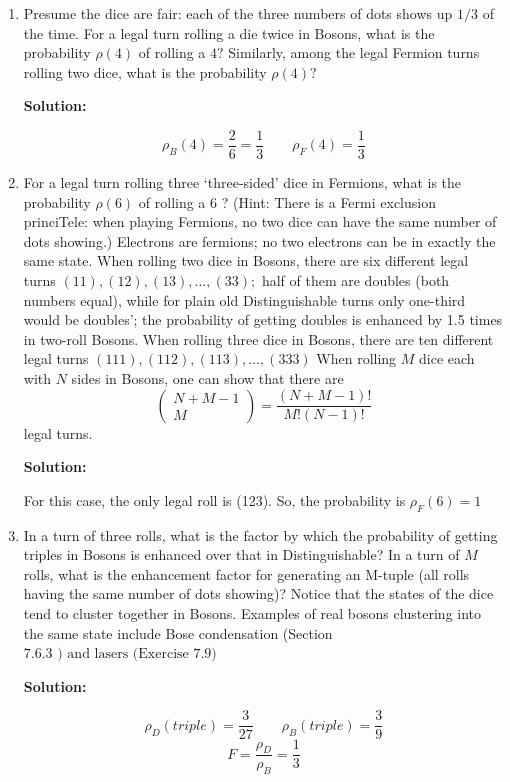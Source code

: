 \documentclass[10pt]{article}
\newenvironment{Solution}
    {\textbf{Solution:}
    
    \vspace{5mm}
    \begin{tcolorbox}
    }
    {
    \end{tcolorbox}
    \vspace{5mm}
    }
\begin{document}
\begin{enumerate}
    \item Presume the dice are fair: each of the three numbers of dots shows up $1 / 3$ of the time. For a legal turn rolling a die twice in Bosons, what is the probability $\rho(4)$ of rolling a $4 ?$ Similarly, among the legal Fermion turns rolling two dice, what is the probability $\rho(4) ?$

\begin{Solution}
\begin{equation}
    \boxed{\rho_B(4) = \frac{2}{6}= \frac{1}{3}} \qquad \boxed{\rho_F(4) = \frac{1}{3}} 
\end{equation}
\end{Solution}

    \item For a legal turn rolling three `three-sided' dice in Fermions, what is the probability $\rho(6)$ of rolling a 6 ? (Hint: There is a Fermi exclusion princiTele: when playing Fermions, no two dice can have the same number of dots showing.) Electrons are fermions; no two electrons can be in exactly the same state. When rolling two dice in Bosons, there are six different legal turns $(11),(12),(13), \ldots,(33) ;$ half of them are doubles (both numbers equal), while for plain old Distinguishable turns only one-third would be doubles'; the probability of getting doubles is enhanced by 1.5 times in two-roll Bosons. When rolling three dice in Bosons, there are ten different legal turns $(111),(112),(113), \ldots,(333)$ When rolling $M$ dice each with $N$ sides in Bosons, one can show that there are
    $$
    \left(\begin{array}{c}
    N+M-1 \\
    M
    \end{array}\right)=\frac{(N+M-1) !}{M !(N-1) !}
    $$
    legal turns. 

\begin{Solution}
For this case, the only legal roll is (123). So, the probability is $\boxed{\rho_F(6)=1}$
\end{Solution}

    \item In a turn of three rolls, what is the factor by which the probability of getting triples in Bosons is enhanced over that in Distinguishable? In a turn of $M$ rolls, what is the enhancement factor for generating an M-tuple (all rolls having the same number of dots showing)? Notice that the states of the dice tend to cluster together in Bosons. Examples of real bosons clustering into the same state include Bose condensation (Section $7.6 .3 \text { ) and lasers (Exercise } 7.9)$

\begin{Solution}
\begin{equation}
    \rho_D(triple) = \frac{3}{27} \qquad \rho_B(triple) = \frac{3}{9}
\end{equation}
\begin{equation}
    \boxed{F = \frac{\rho_D}{\rho_B} = \frac{1}{3}}
\end{equation}
\end{Solution}
\end{enumerate}
\end{document}
